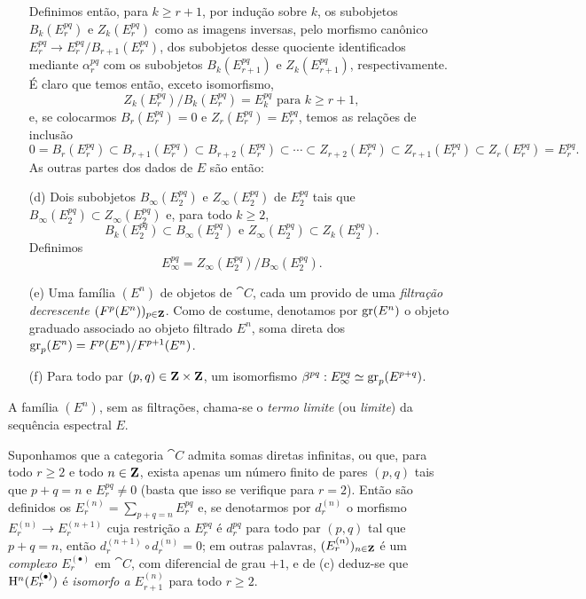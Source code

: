 \begin{env}[11.1.1]
\begin{enumerate}
  Definimos então, para $k\geq r+1$, por indução sobre $k$, os subobjetos $B_k(E_r^{pq})$ e $Z_k(E_r^{pq})$ como as imagens inversas, pelo morfismo canônico $E_r^{pq}\to E_r^{pq}/B_{r+1}(E_r^{pq})$, dos subobjetos desse quociente identificados mediante $\alpha_r^{pq}$ com os subobjetos $B_k(E_{r+1}^{pq})$ e $Z_k(E_{r+1}^{pq})$, respectivamente.
É claro que temos então, exceto isomorfismo,
  \[
  \label{0.11.1.1.1}
    Z_k(E_r^{pq})/B_k(E_r^{pq})=E_k^{pq}\text{ para }k\geq r+1,
    \tag{11.1.1.1}
  \]
  e, se colocarmos $B_r(E_r^{pq})=0$ e $Z_r(E_r^{pq})=E_r^{pq}$, temos as relações de inclusão
  \[
  \label{0.11.1.1.2}
    0=B_r(E_r^{pq})\subset B_{r+1}(E_r^{pq})\subset B_{r+2}(E_r^{pq})\subset\cdots\subset Z_{r+2}(E_r^{pq})\subset Z_{r+1}(E_r^{pq})\subset Z_r(E_r^{pq})=E_r^{pq}.
    \tag{11.1.1.2}
  \]
  As outras partes dos dados de $E$ são então:
  \item[(d) ] Dois subobjetos $B_\infty(E_2^{pq})$ e $Z_\infty(E_2^{pq})$ de $E_2^{pq}$ tais que $B_\infty(E_2^{pq})\subset Z_\infty(E_2^{pq})$ e, para todo $k\geq 2$,
    \[
      B_k(E_2^{pq})\subset B_\infty(E_2^{pq})\text{ e }Z_\infty(E_2^{pq})\subset Z_k(E_2^{pq}).
    \]
    Definimos
    \[
    \label{0.11.1.1.3}
      E_\infty^{pq}=Z_\infty(E_2^{pq})/B_\infty(E_2^{pq}).
      \tag{11.1.1.1.3}
    \]
  \item[(e)]
    Uma família $(E^n)$ de objetos de $\cat{C}$, cada um provido de uma \emph{filtração decrescente $(F^p(E^n))_{p\in\mathbf{Z}}$}.
    Como de costume, denotamos por $\operatorname{gr}(E^n)$ o objeto graduado associado ao objeto filtrado $E^n$, soma direta dos $\operatorname{gr}_p(E^n)=F^p(E^n)/F^{p+1}(E^n)$.
  \item[(f) ] Para todo par $(p,q)\in\mathbf{Z}\times\mathbf{Z}$, um isomorfismo $\beta^{pq}:E_\infty^{pq}\simeq\operatorname{gr}_p(E^{p+q})$.
\end{enumerate}

A família $(E^n)$, sem as filtrações, chama-se o \emph{termo limite} (ou \emph{limite}) da sequência espectral $E$.

Suponhamos que a categoria $\cat{C}$ admita somas diretas infinitas, ou que, para todo $r\geq 2$ e todo $n\in\mathbf{Z}$, exista apenas um número finito de pares $(p,q)$ tais que $p+q=n$ e $E_r^{pq}\neq 0$ (basta que isso se verifique para $r=2$).
Então são definidos os $E_r^{(n)}=\sum_{p+q=n}E_r^{pq}$ e, se denotarmos por $d_r^{(n)}$ o morfismo $E_r^{(n)}\to E_r^{(n+1)}$ cuja restrição a $E_r^{pq}$ é $d_r^{pq}$ para todo par $(p,q)$ tal que $p+q=n$, então $d_r^{(n+1)}\circ d_r^{(n)}=0$; em outras palavras, $(E_r^{(n)})_{n\in\mathbf{Z}}$ é um \emph{complexo $E_r^{(\bullet)}$} em $\cat{C}$, com diferencial de grau $+1$, e de (c) deduz-se que $\mathrm{H}^n(E_r^{(\bullet)})$ é \emph{isomorfo a $E_{r+1}^{(n)}$} para todo $r\geq 2$.
\end{env}


